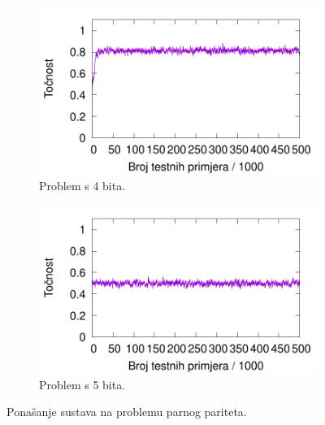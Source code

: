 \documentclass[times, utf8, zavrsni]{fer}
\begin{document}
\begin{figure}
\begin{subfigure}{0.496\textwidth}
        \includegraphics[width=\textwidth]{img/parity/4pare.pdf}
        \caption{Problem s 4 bita.}
        \label{fig:4pare}
    \end{subfigure}
    \begin{subfigure}{0.496\textwidth}
        \centering
        \includegraphics[width=\textwidth]{img/parity/5pare.pdf}
        \caption{Problem s 5 bita.}
        \label{fig:5pare}
    \end{subfigure}
    \caption{Ponašanje sustava na problemu parnog pariteta.}
    \label{fig:pare}
\end{figure}
\end{document}
